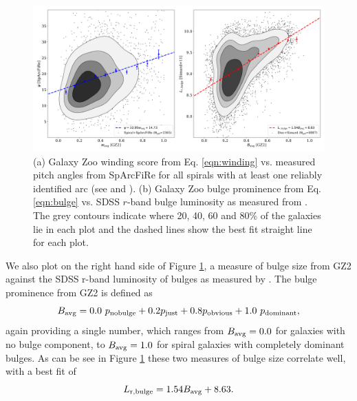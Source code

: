 \documentclass[usenatbib]{mn2e}
\newcommand{\be}{\begin{equation}}
\newcommand{\ee}{\end{equation}}
\begin{document}
\begin{figure}
\includegraphics[width=140mm]{rossfigure.png}
\caption{(a) Galaxy Zoo winding score from Eq. \ref{eqn:winding} vs. measured pitch angles from SpArcFiRe for all spirals with at least one reliably identified arc (see \citealt{DavisHayes2014} and \citealt{Hart2017}). (b) Galaxy Zoo bulge prominence from Eq. \ref{eqn:bulge} vs. SDSS $r$-band bulge luminosity as measured from \citet{Simard2011}. The grey contours indicate where 20, 40, 60 and 80\% of the galaxies lie in each plot and the dashed lines show the best fit straight line for each plot.  \label{pitch}}
\end{figure}

We also plot on the right hand side of Figure \ref{pitch}, a measure of bulge size from GZ2 against the SDSS r-band luminosity of bulges as measured by \citet{Simard2011}. The bulge prominence from GZ2 is defined as
\be
\label{eqn:bulge}
B_{\rm avg} = 0.0 ~p_{\rm no bulge} + 0.2p_{\rm  just} + 0.8p_{\rm obvious}+ 1.0~p_{\rm dominant},
\ee
again providing a single number, which ranges from $B_{\rm avg} = 0.0$ for galaxies with no bulge component, to $B_{\rm avg} = 1.0$ for spiral galaxies with completely dominant bulges. As can be see in Figure \ref{pitch} these two measures of bulge size correlate well, with a best fit of 
\be 
L_{\rm r,bulge} = 1.54 B_{\rm avg}  + 8.63.
\ee
 
 
\end{document}
